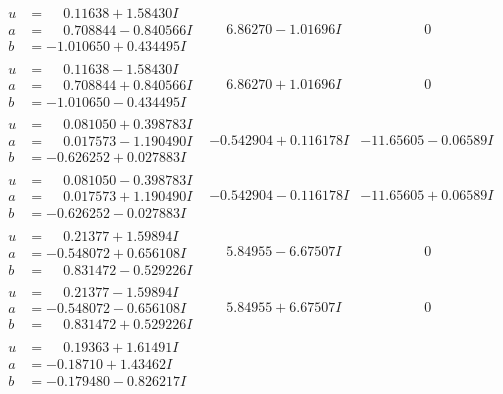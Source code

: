 \documentclass[1p]{elsarticle_modified}
\theoremstyle{definition}
\begin{document}
$$\begin{array}{c|c|c}
\begin{aligned}
u &= \phantom{-}0.11638 + 1.58430 I \\
a &= \phantom{-}0.708844 - 0.840566 I \\
b &= -1.010650 + 0.434495 I\end{aligned}
 & \phantom{-}6.86270 - 1.01696 I & \phantom{-0.000000 } 0 \\ \hline\begin{aligned}
u &= \phantom{-}0.11638 - 1.58430 I \\
a &= \phantom{-}0.708844 + 0.840566 I \\
b &= -1.010650 - 0.434495 I\end{aligned}
 & \phantom{-}6.86270 + 1.01696 I & \phantom{-0.000000 } 0 \\ \hline\begin{aligned}
u &= \phantom{-}0.081050 + 0.398783 I \\
a &= \phantom{-}0.017573 - 1.190490 I \\
b &= -0.626252 + 0.027883 I\end{aligned}
 & -0.542904 + 0.116178 I & -11.65605 - 0.06589 I \\ \hline\begin{aligned}
u &= \phantom{-}0.081050 - 0.398783 I \\
a &= \phantom{-}0.017573 + 1.190490 I \\
b &= -0.626252 - 0.027883 I\end{aligned}
 & -0.542904 - 0.116178 I & -11.65605 + 0.06589 I \\ \hline\begin{aligned}
u &= \phantom{-}0.21377 + 1.59894 I \\
a &= -0.548072 + 0.656108 I \\
b &= \phantom{-}0.831472 - 0.529226 I\end{aligned}
 & \phantom{-}5.84955 - 6.67507 I & \phantom{-0.000000 } 0 \\ \hline\begin{aligned}
u &= \phantom{-}0.21377 - 1.59894 I \\
a &= -0.548072 - 0.656108 I \\
b &= \phantom{-}0.831472 + 0.529226 I\end{aligned}
 & \phantom{-}5.84955 + 6.67507 I & \phantom{-0.000000 } 0 \\ \hline\begin{aligned}
u &= \phantom{-}0.19363 + 1.61491 I \\
a &= -0.18710 + 1.43462 I \\
b &= -0.179480 - 0.826217 I\end{aligned}

\end{array}$$
\end{document}
